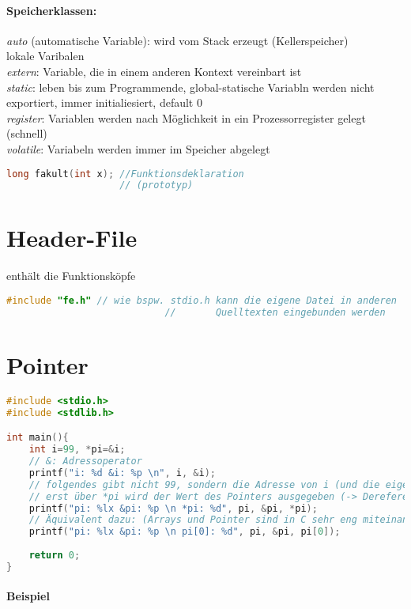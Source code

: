 \paragraph{Speicherklassen:}\parskp
\emph{auto} (automatische Variable): wird vom Stack erzeugt (Kellerspeicher)\\
lokale Varibalen\\
\emph{extern}: Variable, die in einem anderen Kontext vereinbart ist\\
\emph{static}: leben bis zum Programmende, global-statische Variabln werden nicht exportiert, immer initialiesiert, default 0\\
\emph{register}: Variablen werden nach Möglichkeit in ein Prozessorregister gelegt (schnell)\\
\emph{volatile}: Variabeln werden immer im Speicher abgelegt
\begin{lstlisting}[language=C]
long fakult(int x);	//Funktionsdeklaration
					// (prototyp)
\end{lstlisting}

\section{Header-File}
enthält die Funktionsköpfe
\begin{lstlisting}[language=C]
#include "fe.h" // wie bspw. stdio.h kann die eigene Datei in anderen
							//		 Quelltexten eingebunden werden
\end{lstlisting}

\section{Pointer}
\begin{lstlisting}[language=C]
#include <stdio.h>
#include <stdlib.h>

int main(){
	int i=99, *pi=&i;
	// &: Adressoperator
	printf("i: %d &i: %p \n", i, &i);
	// folgendes gibt nicht 99, sondern die Adresse von i (und die eigene) aus.
	// erst über *pi wird der Wert des Pointers ausgegeben (-> Dereferenzieren)
	printf("pi: %lx &pi: %p \n *pi: %d", pi, &pi, *pi);
	// Äquivalent dazu: (Arrays und Pointer sind in C sehr eng miteinander verwandt)
	printf("pi: %lx &pi: %p \n pi[0]: %d", pi, &pi, pi[0]);
	
	return 0;
}
\end{lstlisting}

\paragraph{Beispiel}

